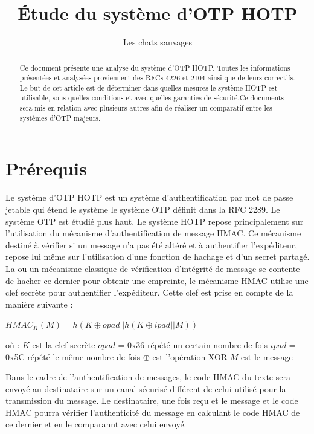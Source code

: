 \documentclass{../res/univ-projet}
\title{\'Etude du syst\`eme d'OTP \og{}HOTP\fg{}}
\author{Les chats sauvages}
\begin{document}
\maketitle

\begin{abstract}
Ce document présente une analyse du système d'OTP \og{}HOTP\fg{}. Toutes les informations présentées et analysées proviennent des RFCs 4226 et 2104 ainsi que 
de leurs correctifs. Le but de cet article est de déterminer dans quelles mesures le système HOTP est utilisable, sous quelles conditions et avec quelles garanties de 
sécurité.Ce documents sera mis en relation avec plusieurs autres afin de réaliser un comparatif entre les systèmes d'OTP majeurs.
\end{abstract}
\newpage
\tableofcontents
\newpage

\section{Prérequis}
Le système d'OTP \og{}HOTP\fg{} est un système d'authentification par mot de passe jetable qui étend le système le système OTP définit dans la RFC 2289. Le système OTP 
est étudié plus haut.
Le système HOTP repose principalement sur l'utilisation du mécanisme d'authentification de message HMAC. Ce mécanisme destiné à vérifier si un message n'a pas été altéré
et à authentifier l'expéditeur, repose lui m\^eme sur l'utilisation d'une fonction de hachage et d'un secret partagé. La ou un mécanisme classique de vérification 
d'intégrité de message se contente de hacher ce dernier pour obtenir une empreinte, le mécanisme HMAC utilise une clef secrète pour authentifier l'expéditeur. Cette clef 
est prise en compte de la manière suivante : 
\begin{center}
$HMAC_K(M) = h(K \oplus opad || h(K \oplus ipad || M))$ 
\end{center}
o\`u :\newline
$K$ est la clef secrète \newline
$opad$ = 0x36 répété un certain nombre de fois \newline
$ipad$ = 0x5C répété le m\^eme nombre de fois \newline
$\oplus$ est l'opération XOR \newline
$M$ est le message \newline


Dans le cadre de l'authentification de messages, le code HMAC du texte sera envoyé au destinataire sur un canal sécurisé différent de celui utilisé pour la transmission
du message. Le destinataire, une fois reçu et le message et le code HMAC pourra vérifier l'authenticité du message en calculant le code HMAC de ce dernier et en le 
comparannt avec celui envoyé.
\end{document}
